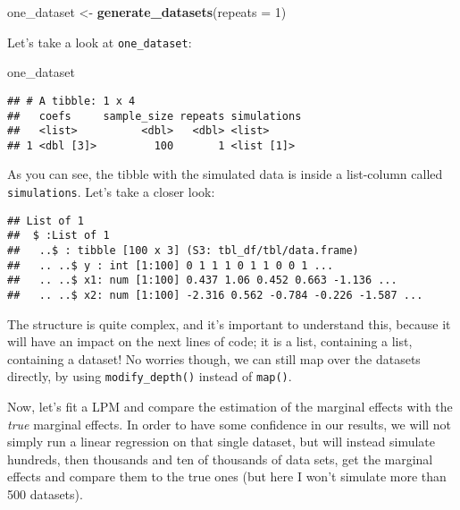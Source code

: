 \documentclass[
]{article}
\newenvironment{Shaded}{\begin{snugshade}}{\end{snugshade}}
\newcommand{\DataTypeTok}[1]{\textcolor[rgb]{0.13,0.29,0.53}{#1}}
\newcommand{\DecValTok}[1]{\textcolor[rgb]{0.00,0.00,0.81}{#1}}
\newcommand{\KeywordTok}[1]{\textcolor[rgb]{0.13,0.29,0.53}{\textbf{#1}}}
\newcommand{\NormalTok}[1]{#1}
\newcommand{\OperatorTok}[1]{\textcolor[rgb]{0.81,0.36,0.00}{\textbf{#1}}}
\newcommand{\StringTok}[1]{\textcolor[rgb]{0.31,0.60,0.02}{#1}}
\begin{document}
\begin{Shaded}
\begin{Highlighting}[]
\NormalTok{one\_dataset \textless{}{-}}\StringTok{ }\KeywordTok{generate\_datasets}\NormalTok{(}\DataTypeTok{repeats =} \DecValTok{1}\NormalTok{)}
\end{Highlighting}
\end{Shaded}

Let's take a look at \texttt{one\_dataset}:

\begin{Shaded}
\begin{Highlighting}[]
\NormalTok{one\_dataset}
\end{Highlighting}
\end{Shaded}

\begin{verbatim}
## # A tibble: 1 x 4
##   coefs     sample_size repeats simulations
##   <list>          <dbl>   <dbl> <list>     
## 1 <dbl [3]>         100       1 <list [1]>
\end{verbatim}

As you can see, the tibble with the simulated data is inside a list-column called \texttt{simulations}.
Let's take a closer look:

\begin{Shaded}
\end{Shaded}

\begin{verbatim}
## List of 1
##  $ :List of 1
##   ..$ : tibble [100 x 3] (S3: tbl_df/tbl/data.frame)
##   .. ..$ y : int [1:100] 0 1 1 1 0 1 1 0 0 1 ...
##   .. ..$ x1: num [1:100] 0.437 1.06 0.452 0.663 -1.136 ...
##   .. ..$ x2: num [1:100] -2.316 0.562 -0.784 -0.226 -1.587 ...
\end{verbatim}

The structure is quite complex, and it's important to understand this, because it will have an
impact on the next lines of code; it is a list, containing a list, containing a dataset! No worries
though, we can still map over the datasets directly, by using \texttt{modify\_depth()} instead of \texttt{map()}.

Now, let's fit a LPM and compare the estimation of the marginal effects with the \emph{true} marginal
effects. In order to have some confidence in our results,
we will not simply run a linear regression on that single dataset, but will instead simulate hundreds,
then thousands and ten of thousands of data sets, get the marginal effects and compare
them to the true ones (but here I won't simulate more than 500 datasets).
\end{document}
